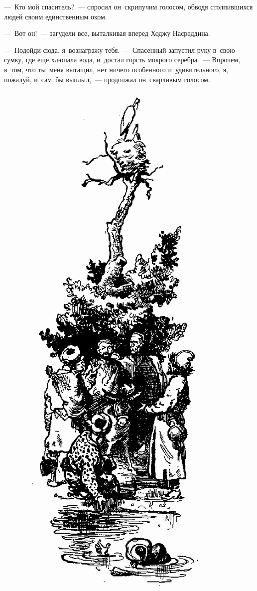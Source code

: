 \documentclass[12pt,a4paper]{book}
\begin{document}
—~Кто мой спаситель?~— спросил он~скрипучим голосом, обводя столпившихся людей своим единственным оком.

—~Вот он!~— загудели все, выталкивая вперед Ходжу Насреддина.

—~Подойди сюда, я~вознагражу тебя.~— Спасенный запустил руку в~свою сумку, где еще хлюпала вода, и~достал горсть мокрого серебра.~— Впрочем, в~том, что ты~меня вытащил, нет ничего особенного и~удивительного, я, пожалуй, и~сам~бы выплыл,~— продолжал он~сварливым голосом.

\begin{figure}[p]
\centering
\includegraphics[scale=0.6]{5.png}
\end{figure}
\end{document}
